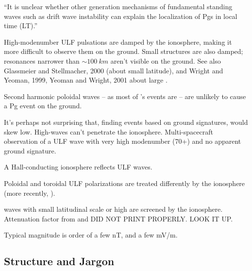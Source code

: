 ``It is unclear whether other generation mechanisms of fundamental standing waves such as drift wave instability\cite{green_1979} can explain the localization of Pgs in local time (LT).''\cite{motoba_2015}


High-modenumber ULF pulsations are damped by the ionosphere, making it more difficult to observe them on the ground\cite{hughes_1976}. Small structures are also damped; resonances narrower than $\sim \SI{100}{km}$ aren't visible on the ground. See also Glassmeier and Stellmacher, 2000 (about small latitude), and Wright and Yeoman, 1999, Yeoman and Wright, 2001 about large \azm. 

Second harmonic poloidal waves -- as most of \cite{dai_2015}'s events are -- are unlikely to cause a Pg event on the ground\cite{takahashi_1992}. 

It's perhaps not surprising that, finding events based on ground signatures, \azm would skew low. High-\azm waves can't penetrate the ionosphere. Multi-spacecraft observation of a ULF wave with very high modenumber (70+) and no apparent ground signature\cite{takahashi_2013}. 


A Hall-conducting ionosphere reflects ULF waves\cite{hughes_1974}. 

Poloidal and toroidal ULF polarizations are treated differently by the ionosphere\cite{greifinger_1968} (more recently, \cite{fujita_1988}).  


\Alfven waves with small latitudinal scale\cite{glassmeier_2000} or high \azm\cite{wright_1999,yeoman_2001} are screened by the ionosphere. Attenuation factor from \cite{hughes_1976} and \cite{glassmeier_1984} DID NOT PRINT PROPERLY. LOOK IT UP. 

Typical magnitude is order of a few nT, and a few mV/m\cite{takahashi_2013}. 

\subsection{Structure and Jargon}

